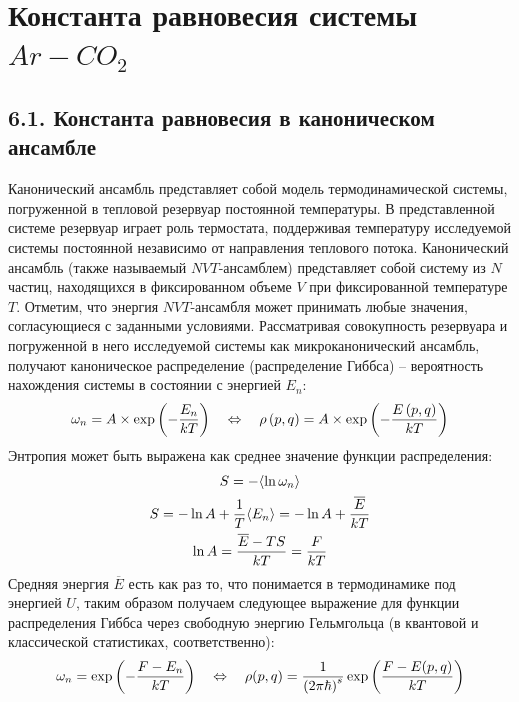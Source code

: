 \section{Константа равновесия системы $Ar-CO_2$}

\subsection*{\protect \textbf{6.1.} Константа равновесия в каноническом ансамбле \cite{keszei, landau2}}

Канонический ансамбль представляет собой модель термодинамической системы, погруженной в тепловой резервуар постоянной температуры. В представленной системе резервуар играет роль термостата, поддерживая температуру исследуемой системы постоянной независимо от направления теплового потока. Канонический ансамбль (также называемый $NVT$-ансамблем) представляет собой систему из $N$ частиц, находящихся в фиксированном объеме $V$ при фиксированной температуре $T$. Отметим, что энергия $NVT$-ансамбля может принимать любые значения, согласующиеся с заданными условиями. Рассматривая совокупность резервуара и погруженной в него исследуемой системы как микроканонический ансамбль, получают каноническое распределение (распределение Гиббса) -- вероятность нахождения системы в состоянии с энергией $E_n$:
\vverh
\begin{gather}
	\omega_n = A \times \exp \left( - \frac{E_n}{kT} \right) \quad \Leftrightarrow \quad \rho \left( p, q \right) = A \times \exp \left( - \frac{E \left( p, q \right)}{kT} \right) \notag
\end{gather}
Энтропия может быть выражена как среднее значение функции распределения:
\vverh
\begin{gather}
	S = - \langle \ln \omega_n \rangle \notag \\
	S = - \ln A + \frac{1}{T} \langle E_n \rangle = - \ln A + \frac{\overline{E}}{kT} \notag \\
	\ln A = \frac{\overline{E} - TS}{kT} = \frac{F}{kT} \notag 
\end{gather}
Средняя энергия $\overline{E}$ есть как раз то, что понимается в термодинамике под энергией $U$, таким образом получаем следующее выражение для функции распределения Гиббса через свободную энергию Гельмгольца (в квантовой и классической статистиках, соответственно):
\vverh
\begin{gather}
	\omega_n = \exp \left( - \frac{F - E_n}{kT} \right) \quad \Leftrightarrow \quad \rho(p, q) = \frac{1}{\left( 2 \pi \hbar \right)^{s}} \exp \left( \frac{F - E(p, q)}{kT} \right) \notag
\end{gather}

